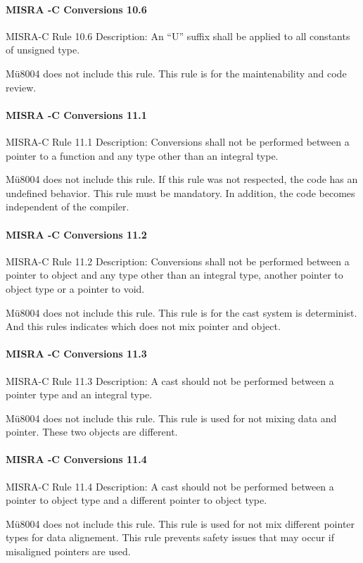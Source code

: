 \paragraph{MISRA -C Conversions 10.6}
MISRA-C Rule 10.6 Description: An “U” suffix shall be applied to all constants of unsigned type.

Mü8004 does not include this rule. This rule is for the maintenability and code review.

\paragraph{MISRA -C Conversions 11.1}
MISRA-C Rule 11.1 Description: Conversions shall not be performed between a pointer to a function and any type other than an integral type.

Mü8004 does not include this rule. If this rule was not respected, the code has an undefined behavior. This rule must be mandatory. In addition, the code becomes independent of the compiler.

\paragraph{MISRA -C Conversions 11.2}
MISRA-C Rule 11.2 Description: Conversions shall not be performed between a pointer to object and any type other than an integral type, another pointer to object type or a pointer to void.

Mü8004 does not include this rule. This rule is for the cast system is determinist. And this rules indicates which does not mix pointer and object.

\paragraph{MISRA -C Conversions 11.3}
MISRA-C Rule 11.3 Description: A cast should not be performed between a pointer type and an integral type. 

Mü8004 does not include this rule. This rule is used for not mixing data and pointer. These two objects are different.

\paragraph{MISRA -C Conversions 11.4}
MISRA-C Rule 11.4 Description: A cast should not be performed between a pointer to object type and a different pointer to object type.

Mü8004 does not include this rule. This rule is used for not mix different pointer types for data alignement. This rule prevents safety issues that may
occur if misaligned pointers are used.

